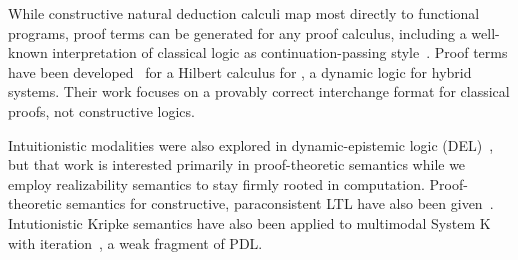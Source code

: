 \documentclass[12pt]{cmuthesis}
\theoremstyle{definition}
\theoremstyle{remark}
\begin{document}
While constructive natural deduction calculi map most directly to functional programs, proof terms can be generated for any proof calculus, including a well-known interpretation of classical logic as continuation-passing style~\cite{DBLP:conf/popl/Griffin90}.
Proof terms have been developed~\cite{DBLP:conf/cpp/FultonP16} for a Hilbert calculus for \dL, a dynamic logic for hybrid systems.
Their work focuses on a provably correct interchange format for classical \dL proofs, not constructive logics.

Intuitionistic modalities were also explored in dynamic-epistemic logic (DEL)~\cite{DBLP:journals/logcom/FrittellaGKPS16}, but that work is interested primarily in proof-theoretic semantics while we employ realizability semantics to stay firmly rooted in computation.
Proof-theoretic semantics for constructive, paraconsistent LTL have also been given~\cite{DBLP:journals/japll/KamideW10}.
Intutionistic Kripke semantics have also been applied to multimodal System K with iteration~\cite{DBLP:journals/fuin/Celani01}, a weak fragment of PDL.
\end{document}

